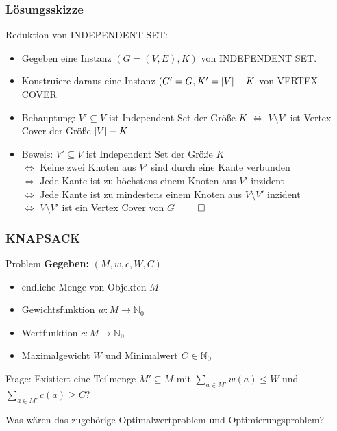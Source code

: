 \begin{frame}
	\frametitle{Lösungsskizze}
	
	Reduktion von INDEPENDENT SET:
	
	\begin{itemize}
		\item Gegeben eine Instanz $(G = (V,E), K)$ von INDEPENDENT SET.
		\item Konstruiere daraus eine Instanz $(G' = G, K' = \left\vert V \right\vert - K$ von VERTEX COVER
		\item Behauptung: $V' \subseteq V$ ist Independent Set der Größe $K$ $\Leftrightarrow$ $V \setminus V'$ ist Vertex Cover der Größe $\left\vert V \right\vert - K$
		\item Beweis: $V' \subseteq V$ ist Independent Set der Größe $K$ \\ $\Leftrightarrow$ Keine zwei Knoten aus $V'$ sind durch eine Kante verbunden \\ $\Leftrightarrow$ Jede Kante ist zu höchstens einem Knoten aus $V'$ inzident \\ $\Leftrightarrow$ Jede Kante ist zu mindestens einem Knoten aus $V \setminus V'$ inzident \\ $\Leftrightarrow$ $V \setminus V'$ ist ein Vertex Cover von $G$ $\qedhere$
	\end{itemize}
\end{frame}

\begin{frame}
 \frametitle{KNAPSACK}
 
 \begin{block}{Problem}
 \textbf{Gegeben:} $(M, w, c, W, C)$
 \begin{itemize}
  \item endliche Menge von Objekten $M$
  \item Gewichtsfunktion $w:M \rightarrow \mathbb{N}_0$
  \item Wertfunktion $c:M \rightarrow \mathbb{N}_0$
  \item Maximalgewicht $W$ und Minimalwert $C$ $\in \mathbb{N}_0$
 \end{itemize}
 \end{block}
 
Frage: Existiert eine Teilmenge $M' \subseteq M$ mit $\sum_{a\in M'} w(a) \leq W$ und $\sum_{a\in  M'} c(a) \geq C$?

\pause

Was wären das zugehörige Optimalwertproblem und Optimierungsproblem?
\end{frame}

